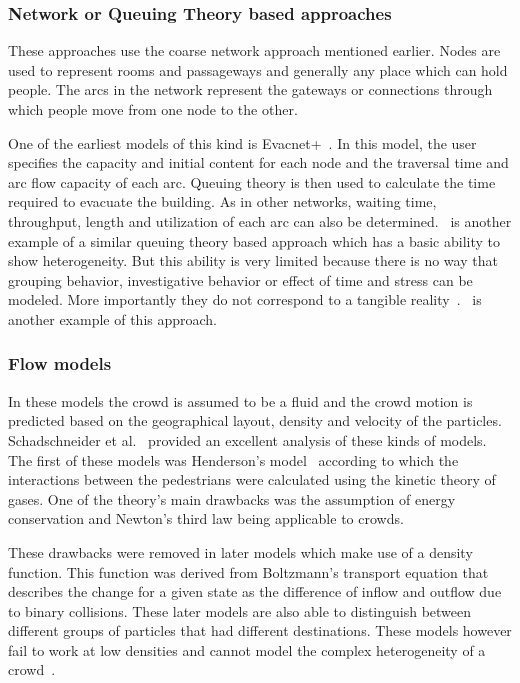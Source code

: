 \subsubsection{Network or Queuing Theory based approaches}

These approaches use the coarse network approach mentioned earlier. Nodes are used to represent rooms and passageways and generally any place which can hold people. The arcs in the network represent the gateways or connections through which people move from one node to the other.

One of the earliest models of this kind is Evacnet+~\cite{kisko1985evacnet+}. In this model, the user specifies the capacity and initial content for each node and the traversal time and arc flow capacity of each arc. Queuing theory is then used to calculate the time required to evacuate the building. As in other networks, waiting time, throughput, length and utilization of each arc can also be determined.~\cite{Lammel:2009dj} is another example of a similar queuing theory based approach which has a basic ability to show heterogeneity. But this ability is very limited because there is no way that grouping behavior, investigative behavior or effect of time and stress can be modeled. More importantly they do not correspond to a tangible reality~\cite{Bierlaire:2003uj}.~\cite{Lino:2009td} is another example of this approach.

\subsubsection{Flow models}

In these models the crowd is assumed to be a fluid and the crowd motion is predicted based on the geographical layout, density and velocity of the particles. Schadschneider et al.~\cite{Schadschneider:2008cz} provided an excellent analysis of these kinds of models. The first of these models was Henderson's model~\cite{Henderson:1974ve} according to which the interactions between the pedestrians were calculated using the kinetic theory of gases. One of the theory's main drawbacks was the assumption of energy conservation and Newton's third law being applicable to crowds.

These drawbacks were removed in later models which make use of a density function. This function was derived from Boltzmann's transport equation that describes the change for a given state as the difference of inflow and outflow due to binary collisions. These later models are also able to distinguish between different groups of particles that had different destinations. These models however fail to work at low densities and cannot model the complex heterogeneity of a crowd~\cite{Bierlaire:2003uj}.


